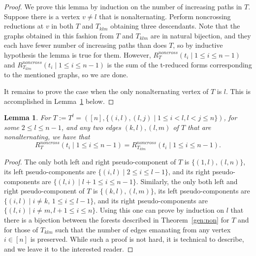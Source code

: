 \documentclass[10pt]{amsart}
\newtheorem{lemm}[theo]{Lemma}
\theoremstyle{definition}
\numberwithin{equation}{section}
\newcommand*\+{\smash{\lower2pt\hbox{\rlap{\vrule height14pt}}\raise2pt\hbox{\rlap{\hskip-3pt \vrule height.4pt depth0pt width14.7pt}}}}
\begin{document}
\begin{proof}
We prove this lemma by induction on the number of increasing paths in $T$. Suppose there is a vertex $v\neq l$ that is nonalternating. Perform noncrossing reductions at $v$ in both $T$ and $T_{klm}$ obtaining three descendants. Note that the graphs obtained in this fashion from $T$ and $T_{klm}$ are in natural bijection, and they each have fewer number of increasing paths than does $T$, so by inductive hypothesis the lemma is true for them. However, $R^{noncross}_T(t_i \mid 1\leq i\leq n-1)$ and $R^{noncross}_{T_{klm}}(t_i \mid 1\leq i\leq n-1)$ is the sum of the t-reduced forms corresponding to the mentioned graphs, so we are done.

It remains to prove the case when the only nonalternating vertex of $T$ is $l$. This is accomplished in Lemma~\ref{lem:ll} below.
\end{proof}

\begin{lemm}\label{lem:ll}
For $T:=T^l=([n], \{(i,l), (l, j) \mid 1\leq i<l, l<j\leq n\})$, for some $2\leq l\leq n-1$, and any two edges $(k,l), (l,m)$ of $T$ that are nonalternating, we have that
\begin{equation}\label{eq:noncrossbis}
R^{noncross}_T(t_i \mid 1\leq i\leq n-1)=R^{noncross}_{T_{klm}}(t_{i} \mid 1\leq i\leq n-1).
\end{equation}
\end{lemm}

\begin{proof}
The only both left and right pseudo-component of $T$ is $\{(1,l), (l, n)\}$, its left pseudo-components are $\{(i,l) \mid 2\leq i\leq l-1\}$, and its right pseudo-components are $\{(l,i) \mid l+1\leq i\leq n-1\}$. Similarly, the only both left and right pseudo-component of $T$ is $\{(k,l), (l, m)\}$, its left pseudo-components are $\{(i,l)\mid i \neq k$, $1\leq i\leq l-1\}$, and its right pseudo-components are $\{(l,i)\mid i\neq m, l+1\leq i\leq n\}$. Using this one can prove by induction on $l$ that there is a bijection between the forests described in Theorem~\ref{gen:non} for $T$ and for those of $T_{klm}$ such that the number of edges emanating from any vertex $i \in [n]$ is preserved. While such a proof is not hard, it is technical to describe, and we leave it to the interested reader.
\end{proof}
\end{document}
